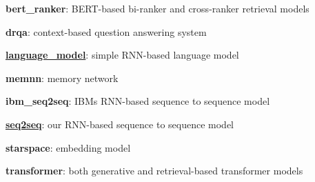 \begin{DoxyItemize}
\item {\bfseries bert\+\_\+ranker}\+: B\+E\+R\+T-\/based bi-\/ranker and cross-\/ranker retrieval models
\item {\bfseries drqa}\+: context-\/based question answering system
\item {\bfseries \hyperlink{namespacelanguage__model}{language\+\_\+model}}\+: simple R\+N\+N-\/based language model
\item {\bfseries memnn}\+: memory network
\item {\bfseries ibm\+\_\+seq2seq}\+: I\+BM\textquotesingle{}s R\+N\+N-\/based sequence to sequence model
\item {\bfseries \hyperlink{namespaceseq2seq}{seq2seq}}\+: our R\+N\+N-\/based sequence to sequence model
\item {\bfseries starspace}\+: embedding model
\item {\bfseries transformer}\+: both generative and retrieval-\/based transformer models 
\end{DoxyItemize}